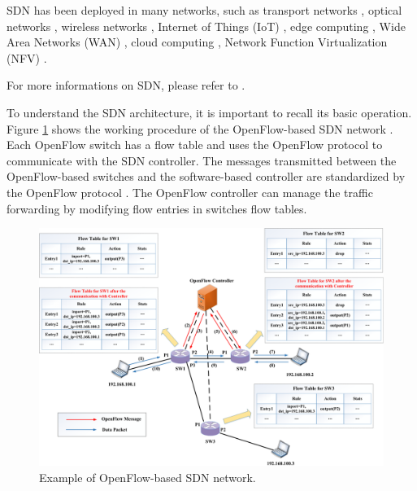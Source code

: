 \begin{itemize}
SDN has been deployed in many networks, such as transport networks \cite{Alvizu2017}, optical networks \cite{Thyagaturu2016}, wireless networks \cite{Haque2016, Chen2015}, Internet of Things (IoT) \cite{Bera2017}, edge computing \cite{Baktir2017}, Wide Area Networks (WAN) \cite{Michel2017}, cloud computing \cite{Jain2013}, Network Function Virtualization (NFV) \cite{Li2015, Liang2015}.
\end{itemize}
For more informations on SDN, please refer to \cite{Nunes2014, Jarraya2014, Xia2015, Hu2014, Xie2015, Trois2016, Huang2017, Blenk2016}.

%
To understand the SDN architecture, it is important to recall its basic operation. Figure \ref{fig:{WorkFlow}} shows the working procedure of the OpenFlow-based SDN network \cite{OFP13}. Each OpenFlow switch has a flow table and uses the OpenFlow protocol to communicate with the SDN controller. The messages transmitted between the OpenFlow-based switches and the software-based controller are standardized by the OpenFlow protocol \cite{Erickson2013}. The OpenFlow controller can manage the traffic forwarding by modifying flow entries in switches flow tables.
\begin{figure}[tb!]
	\centering
	\includegraphics[width=13cm]{figure/WorkFlow.png}
	\caption{Example of OpenFlow-based SDN network.}
	\label{fig:{WorkFlow}}
\end{figure}
